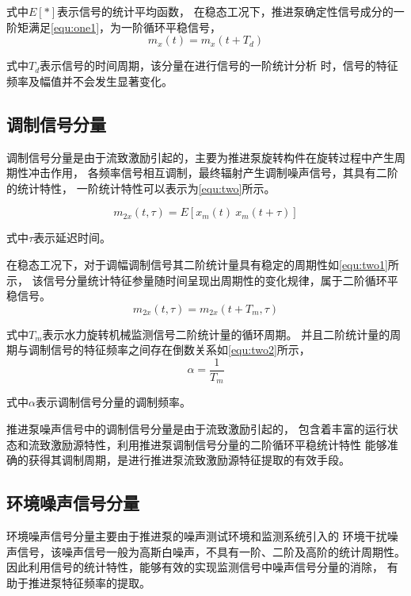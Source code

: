 式中$E[*]$表示信号的统计平均函数，
在稳态工况下，推进泵确定性信号成分的一阶矩满足\autoref{equ:one1}，为一阶循环平稳信号，
\begin{equation}
    \label{equ:one1}
    m_{x}\left ( t \right ) =m_{x}\left ( t+T_d \right )
\end{equation}

式中$T_{d}$表示信号的时间周期，该分量在进行信号的一阶统计分析
时，信号的特征频率及幅值并不会发生显著变化。
\subsection{调制信号分量}
调制信号分量是由于流致激励引起的，主要为推进泵旋转构件在旋转过程中产生周期性冲击作用，
各频率信号相互调制，最终辐射产生调制噪声信号，其具有二阶的统计特性，
一阶统计特性可以表示为\autoref{equ:two}所示。

\begin{equation}
    \label{equ:two}
    m_{2x}\left ( t, \tau \right )  =E\left [ x_{m}\left ( t \right ) \ x_{m}\left ( t+\tau \right )  \right ] 
\end{equation}

式中$\tau$表示延迟时间。

在稳态工况下，对于调幅调制信号其二阶统计量具有稳定的周期性如\autoref{equ:two1}所示，
该信号分量统计特征参量随时间呈现出周期性的变化规律，属于二阶循环平稳信号。
\begin{equation}
    \label{equ:two1}
    m_{2x}\left ( t, \tau \right )  =m_{2x}\left ( t+T_m, \tau \right )
\end{equation}

式中$T_m$表示水力旋转机械监测信号二阶统计量的循环周期。
并且二阶统计量的周期与调制信号的特征频率之间存在倒数关系如\autoref{equ:two2}所示，
\begin{equation}
    \label{equ:two2}
    \alpha =\frac{1}{T_{m} } 
\end{equation}

式中$\alpha$表示调制信号分量的调制频率。 

推进泵噪声信号中的调制信号分量是由于流致激励引起的，
包含着丰富的运行状态和流致激励源特性，利用推进泵调制信号分量的二阶循环平稳统计特性
能够准确的获得其调制周期，是进行推进泵流致激励源特征提取的有效手段。
\subsection{环境噪声信号分量}
环境噪声信号分量主要由于推进泵的噪声测试环境和监测系统引入的
环境干扰噪声信号，该噪声信号一般为高斯白噪声，不具有一阶、二阶及高阶的统计周期性。
因此利用信号的统计特性，能够有效的实现监测信号中噪声信号分量的消除，
有助于推进泵特征频率的提取。

